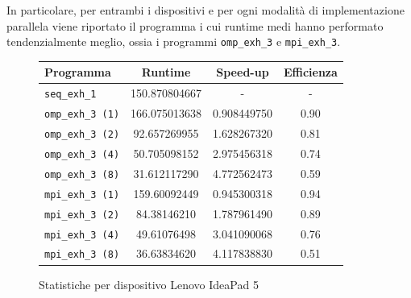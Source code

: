 \documentclass[12pt]{report}
\begin{document}
    In particolare, per entrambi i dispositivi e per ogni modalità di implementazione parallela viene riportato il programma i cui runtime medi hanno performato tendenzialmente meglio, ossia i programmi \texttt{omp\_exh\_3} e \texttt{mpi\_exh\_3}.

    \begin{figure}[H]
        \centering

        \begin{tabular}{ l | c | c | c }
            \textbf{Programma} & \textbf{Runtime} & \textbf{Speed-up} & \textbf{Efficienza}\\
            \hline
            \texttt{seq\_exh\_1} & 150.870804667 & - & - \\
            \hline
            \texttt{omp\_exh\_3 (1)} & 166.075013638 & 0.908449750 & 0.90 \\
            \texttt{omp\_exh\_3 (2)} & 92.657269955 & 1.628267320 & 0.81 \\
            \texttt{omp\_exh\_3 (4)} & 50.705098152 & 2.975456318 & 0.74 \\
            \texttt{omp\_exh\_3 (8)} & 31.612117290 & 4.772562473 & 0.59 \\
            \hline
            \texttt{mpi\_exh\_3 (1)} & 159.60092449 & 0.945300318 & 0.94 \\
            \texttt{mpi\_exh\_3 (2)} & 84.38146210 & 1.787961490 & 0.89 \\
            \texttt{mpi\_exh\_3 (4)} & 49.61076498 & 3.041090068 & 0.76 \\
            \texttt{mpi\_exh\_3 (8)} & 36.63834620 & 4.117838830 & 0.51 \\
        \end{tabular}
        \caption{Statistiche per dispositivo Lenovo IdeaPad 5}
        \label{fig:stats_ip5_1}
    \end{figure}
\end{document}
